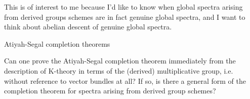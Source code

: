 \begin{ideas}
\begin{ideas}
  \item This is of interest to me because I'd like to know when global
    spectra arising from derived groups schemes are in fact genuine
    global spectra, and I want to think about abelian descent of
    genuine global spectra.

  \end{ideas}


\item Atiyah-Segal completion theorems

  \begin{ideas}
  \item Can one prove the Atiyah-Segal completion theorem immediately
    from the description of K-theory in terms of the (derived)
    multiplicative group, i.e. without reference to vector bundles at
    all? If so, is there a general form of the completion theorem
    for spectra arising from derived group schemes?
  \end{ideas}
\end{ideas}



